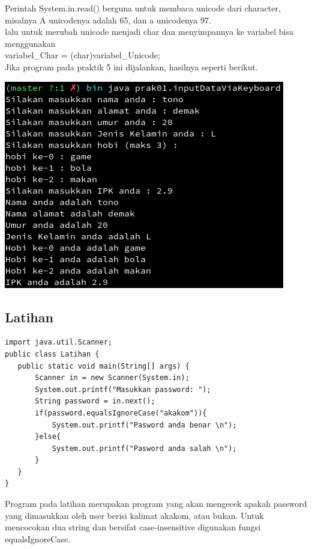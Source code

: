 \documentclass[a4paper,12pt]{article}
\begin{document}
Perintah System.in.read() berguna untuk membaca unicode dari character,
misalnya A unicodenya adalah 65, dan a unicodenya 97.\\

lalu untuk merubah unicode menjadi char dan menyimpannya ke variabel
bisa menggunakan\\
variabel\_Char = (char)variabel\_Unicode;\\

Jika program pada praktik 5 ini dijalankan, hasilnya seperti berikut.
\begin{center}
    \includegraphics[width=\textwidth]{8.png} 
\end{center}

\subsection{Latihan}
\begin{lstlisting}
import java.util.Scanner;
public class Latihan {
   public static void main(String[] args) {
       Scanner in = new Scanner(System.in);
       System.out.printf("Masukkan password: ");
       String password = in.next();
       if(password.equalsIgnoreCase("akakom")){
           System.out.printf("Pasword anda benar \n");
       }else{
           System.out.printf("Pasword anda salah \n");
       }
   }
}
\end{lstlisting}

Program pada latihan merupakan program yang akan mengecek
apakah password yang dimasukkan oleh user berisi kalimat
akakom, atau bukan. Untuk mencocokan dua string dan
bersifat case-insensitive digunakan fungsi equalsIgnoreCase.
\end{document}
